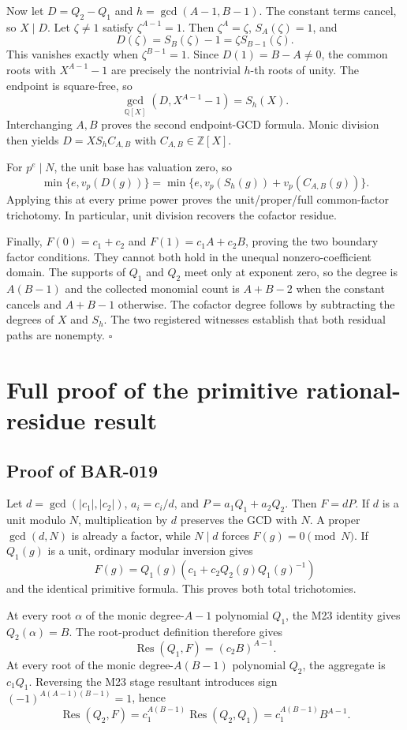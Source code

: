 \documentclass[11pt]{article}
\begin{document}
Now let \(D=Q_2-Q_1\) and \(h=\gcd(A-1,B-1)\). The constant terms cancel,
so \(X\mid D\). Let \(\zeta\ne1\) satisfy \(\zeta^{A-1}=1\). Then
\(\zeta^A=\zeta\), \(S_A(\zeta)=1\), and
\[
D(\zeta)=S_B(\zeta)-1=\zeta S_{B-1}(\zeta).
\]
This vanishes exactly when \(\zeta^{B-1}=1\). Since
\(D(1)=B-A\ne0\), the common roots with \(X^{A-1}-1\) are precisely the
nontrivial \(h\)-th roots of unity. The endpoint is square-free, so
\[
\gcd_{\mathbb Q[X]}(D,X^{A-1}-1)=S_h(X).
\]
Interchanging \(A,B\) proves the second endpoint-GCD formula. Monic division
then yields \(D=XS_hC_{A,B}\) with \(C_{A,B}\in\mathbb Z[X]\).

For \(p^e\mid N\), the unit base has valuation zero, so
\[
\min\{e,v_p(D(g))\}
=\min\{e,v_p(S_h(g))+v_p(C_{A,B}(g))\}.
\]
Applying this at every prime power proves the unit/proper/full common-factor
trichotomy. In particular, unit division recovers the cofactor residue.

Finally, \(F(0)=c_1+c_2\) and \(F(1)=c_1A+c_2B\), proving the two boundary
factor conditions. They cannot both hold in the unequal nonzero-coefficient
domain. The supports of \(Q_1\) and \(Q_2\) meet only at exponent zero, so
the degree is \(A(B-1)\) and the collected monomial count is \(A+B-2\) when
the constant cancels and \(A+B-1\) otherwise. The cofactor degree follows by
subtracting the degrees of \(X\) and \(S_h\). The two registered witnesses
establish that both residual paths are nonempty. \(\square\)

\section{Full proof of the primitive rational-residue result}

\subsection{Proof of BAR-019}\label{proof:BAR-019}

Let \(d=\gcd(|c_1|,|c_2|)\), \(a_i=c_i/d\), and
\(P=a_1Q_1+a_2Q_2\). Then \(F=dP\). If \(d\) is a unit modulo \(N\),
multiplication by \(d\) preserves the GCD with \(N\). A proper
\(\gcd(d,N)\) is already a factor, while \(N\mid d\) forces
\(F(g)=0\pmod N\). If \(Q_1(g)\) is a unit, ordinary modular inversion gives
\[
F(g)=Q_1(g)\left(c_1+c_2Q_2(g)Q_1(g)^{-1}\right)
\]
and the identical primitive formula. This proves both total trichotomies.

At every root \(\alpha\) of the monic degree-\(A-1\) polynomial \(Q_1\),
the M23 identity gives \(Q_2(\alpha)=B\). The root-product definition
therefore gives
\[
\operatorname{Res}(Q_1,F)=(c_2B)^{A-1}.
\]
At every root of the monic degree-\(A(B-1)\) polynomial \(Q_2\), the
aggregate is \(c_1Q_1\). Reversing the M23 stage resultant introduces sign
\((-1)^{A(A-1)(B-1)}=1\), hence
\[
\operatorname{Res}(Q_2,F)
=c_1^{A(B-1)}\operatorname{Res}(Q_2,Q_1)
=c_1^{A(B-1)}B^{A-1}.
\]
\end{document}
